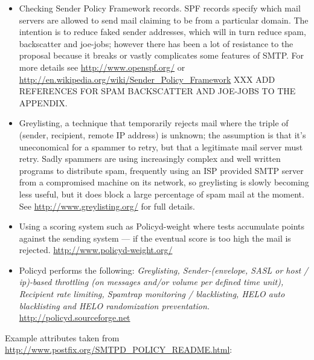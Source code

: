\documentclass[a4paper,12pt,draft]{article}
\begin{document}
\begin{itemize}

    \item Checking Sender Policy Framework records.  SPF records specify
        which mail servers are allowed to send mail claiming to be from a
        particular domain.  The intention is to reduce faked sender
        addresses, which will in turn reduce spam, backscatter and
        joe-jobs; however there has been a lot of resistance to the
        proposal because it breaks or vastly complicates some features of
        SMTP.  For more details see \url{http://www.openspf.org/} or
        \url{http://en.wikipedia.org/wiki/Sender_Policy_Framework} XXX ADD
        REFERENCES FOR SPAM BACKSCATTER AND JOE-JOBS TO THE APPENDIX.

    \item Greylisting, a technique that temporarily rejects mail where the
        triple of (sender, recipient, remote IP address) is unknown; the
        assumption is that it's uneconomical for a spammer to retry, but
        that a legitimate mail server must retry.  Sadly spammers are using
        increasingly complex and well written programs to distribute spam,
        frequently using an ISP provided SMTP server from a compromised
        machine on its network, so greylisting is slowly becoming less
        useful, but it does block a large percentage of spam mail at the
        moment.  See \url{http://www.greylisting.org/} for full details.

    \item Using a scoring system such as Policyd-weight where 
        tests accumulate points against the sending system --- if the
        eventual score is too high the mail is rejected.
        \url{http://www.policyd-weight.org/} 
        
    \item Policyd performs the following: \textit{Greylisting,
        Sender-(envelope, SASL or host / ip)-based throttling (on messages
        and/or volume per defined time unit), Recipient rate limiting,
        Spamtrap monitoring / blacklisting, HELO auto blacklisting and HELO
        randomization preventation.\/}  \url{http://policyd.sourceforge.net}

\end{itemize}

Example attributes taken from \newline
\url{http://www.postfix.org/SMTPD_POLICY_README.html}:
\end{document}
